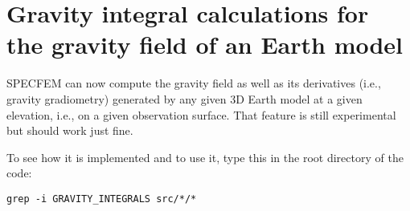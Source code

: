 \chapter{Gravity integral calculations for the gravity field of an Earth model}


SPECFEM can now compute the gravity field as well as its derivatives (i.e., gravity gradiometry)
generated by any given 3D Earth model at a given elevation, i.e., on a given observation surface.
That feature is still experimental but should work just fine.\newline

To see how it is implemented and to use it, type this in the root directory of the code:
\begin{verbatim}
grep -i GRAVITY_INTEGRALS src/*/*
\end{verbatim}

